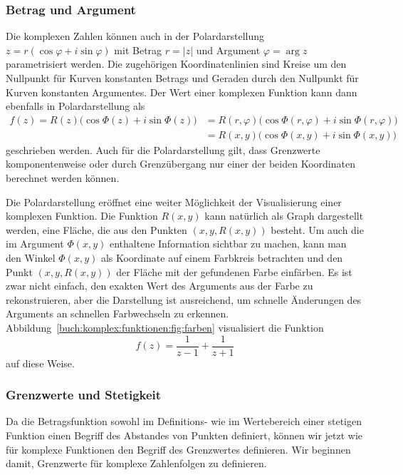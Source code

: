 \subsubsection{Betrag und Argument}
Die komplexen Zahlen können auch in der Polardarstellung
$z=r(\cos \varphi + i\sin\varphi)$ mit Betrag $r=|z|$ und
Argument $\varphi=\operatorname{arg}z$ parametrisiert werden.
Die zugehörigen Koordinatenlinien sind Kreise um den Nullpunkt
für Kurven konstanten Betrags und Geraden durch den Nullpunkt
für Kurven konstanten Argumentes.
Der Wert einer komplexen Funktion kann dann ebenfalls in Polardarstellung
als
\begin{align*}
f(z)
=
R(z) \bigl(\cos\Phi(z) + i\sin\Phi(z)\bigr)
&=
R(r,\varphi) \bigl(\cos\Phi(r,\varphi) + i\sin\Phi(r,\varphi)\bigr)
\\
&=
R(x,y)\bigl(\cos\Phi(x,y) + i\sin\Phi(x,y)\bigr)
\end{align*}
geschrieben werden.
Auch für die Polardarstellung gilt, dass Grenzwerte komponentenweise
oder durch Grenzübergang nur einer der beiden Koordinaten
berechnet werden können.

Die Polardarstellung eröffnet eine weiter Möglichkeit der
Visualisierung einer komplexen Funktion.
%
Die Funktion $R(x,y)$ kann natürlich als Graph dargestellt
werden, eine Fläche, die aus den Punkten $(x,y,R(x,y))$
besteht.
Um auch die im Argument $\Phi(x,y)$ enthaltene Information
sichtbar zu machen, kann man den Winkel $\Phi(x,y)$ als Koordinate
auf einem Farbkreis betrachten und den Punkt $(x,y,R(x,y))$
%
der Fläche mit der gefundenen Farbe einfärben.
Es ist zwar nicht einfach, den exakten Wert des Arguments aus
der Farbe zu rekonstruieren, aber die Darstellung ist ausreichend,
um schnelle Änderungen des Arguments an schnellen Farbwechseln
zu erkennen.
Abbildung~\ref{buch:komplex:funktionen:fig:farben}
visualisiert die Funktion 
\[
f(z)
=
\frac{1}{z-1}
+
\frac{1}{z+1}
\]
auf diese Weise.

%
%
\subsubsection{Grenzwerte und Stetigkeit}
Da die Betragsfunktion sowohl im Definitions- wie im Wertebereich
einer stetigen Funktion einen Begriff des Abstandes von Punkten
definiert, können wir jetzt wie für komplexe Funktionen den Begriff des
Grenzwertes definieren.
Wir beginnen damit, Grenzwerte für komplexe Zahlenfolgen zu definieren.

